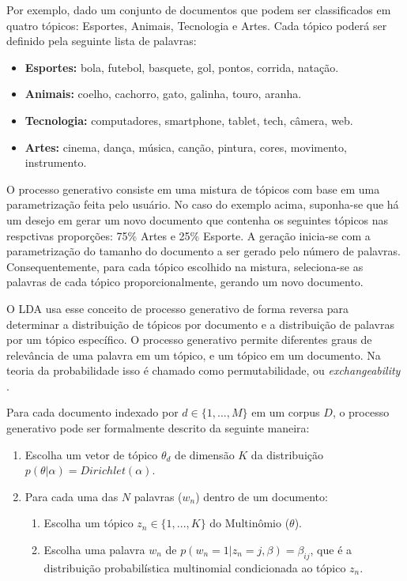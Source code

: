 \documentclass[12pt,a4paper]{article}
\begin{document}
 Por exemplo, dado um conjunto de documentos que podem ser classificados em quatro tópicos: Esportes, Animais, Tecnologia e Artes. 
 Cada tópico poderá ser definido pela seguinte lista de palavras:

\begin{itemize}
  \item \textbf{ Esportes:} bola, futebol, basquete, gol, pontos, corrida, natação.
  \item \textbf{ Animais:} coelho, cachorro, gato, galinha, touro, aranha.
  \item \textbf{ Tecnologia:} computadores, smartphone, tablet, tech, câmera, web.
  \item \textbf{ Artes:} cinema, dança, música, canção, pintura, cores, movimento, instrumento.
\end{itemize}

O processo generativo consiste em uma mistura de tópicos com base em uma parametrização feita pelo usuário. No caso do exemplo acima, suponha-se que há um desejo em gerar um novo documento que contenha os seguintes tópicos nas respctivas proporções: 75\% Artes e 25\% Esporte. A geração inicia-se com a parametrização do tamanho do documento a ser gerado pelo número de palavras. Consequentemente, para cada tópico escolhido na mistura, seleciona-se as palavras de cada tópico proporcionalmente, gerando um novo documento.

 O LDA usa esse conceito de processo generativo de forma reversa para determinar a distribuição de tópicos por documento e a distribuição de palavras por um tópico específico. 
 O processo generativo permite diferentes graus de relevância de uma palavra em um tópico, e um tópico em um documento. Na teoria da probabilidade isso é chamado como permutabilidade,
 ou \textit{exchangeability} \cite{aldous1985exchangeability}. 
 
 Para cada documento indexado por $d \in \{1,. . . , M\}$ em um corpus $D$, o processo generativo pode ser formalmente descrito da seguinte maneira:


\begin{enumerate}
  \item Escolha um vetor de tópico $\theta _d$ de dimensão $K$ da distribuição $p(\theta|\alpha)=Dirichlet(\alpha)$.
  \item Para cada uma das $N$ palavras ($w_n$) dentro de um documento:
  \begin{enumerate}
  	\item Escolha um tópico \(z_n \in \{1,. . . , K\}\) do Multinômio ($\theta$).
    \item Escolha uma palavra $w_n$ de \(p(w_n=1| z_n=j,\beta)=\beta _{ij}\), que é a distribuição probabilística multinomial condicionada ao tópico $z_n$.
  \end{enumerate}
\end{enumerate}
\end{document}
